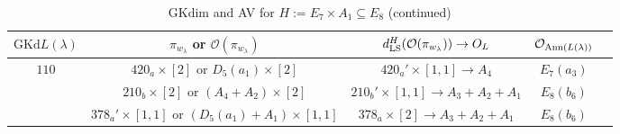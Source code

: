 \documentclass[reqno,12pt]{amsart}
\numberwithin{equation}{section}
\theoremstyle{plain}
\theoremstyle{definition}
\newcommand{\lam}{\lambda}
\renewcommand{\subset}{\subseteq}
\begin{document}
\begin{table}[htbp]\caption{ GKdim and AV for $H:=E_7\times A_1\subset E_8$ (continued)} 
	\label{tabe7a1-2}
	\centering
	\renewcommand{\arraystretch}{1.5}
	\setlength\tabcolsep{5pt}
	
\small	\begin{tabular}{|c|c|c|c|c|}
		\hline $\mathrm{GKd} L(\lambda)$ & ${\pi_{w_{\lam}}}$ or    $\mathcal{O}({\pi_{w_{\lam}}})$& $d_{\rm LS}^{H}(\mathcal{O}(\pi_{w_\lambda}))\rightarrow O_{L}$ & $\mathcal{O}_{{\rm Ann}(L(\lambda))}$ \\ \hline





$ 110$  
 &  $ 420_a\times [2]$ or $D_5(a_1)\times [2]$&    $420_a'\times [1,1] \rightarrow A_4$     &   $ E_7(a_3)$      \\
 
 &  $ 210_b\times [2]$  or $(A_4+A_2)\times [2]$&    $210_b'\times [1,1] \rightarrow A_3+A_2+A_1$     &   $ E_8(b_6)$      \\

 &  $ 378_a'\times [1,1]$  or $(D_5(a_1)+A_1)\times [1,1]$&    $378_a\times [2] \rightarrow A_3+A_2+A_1$     &   $ E_8(b_6)$      \\
  \hline


\end{tabular}
\end{table}
\end{document}
